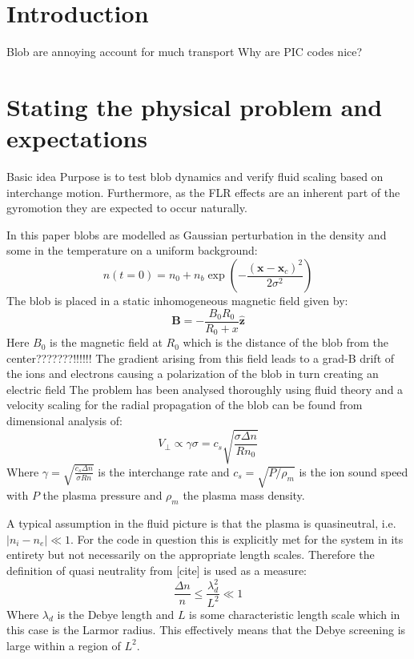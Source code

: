 \documentclass[9pt,twocolumn]{article}
\newcommand{\fd}[1]{\mathbf{#1}}
\renewcommand{\=}[1]{\stackrel{#1}{=}} %
\theoremstyle{definition}
\theoremstyle{remark}
\begin{document}
\section{Introduction}
Blob are annoying account for much transport
Why are PIC codes nice?
\section{Stating the physical problem and expectations}
Basic idea
Purpose is to test blob dynamics and verify fluid scaling based on interchange motion. Furthermore, as the FLR effects are an inherent part of the gyromotion they are expected to occur naturally.

In this paper blobs are modelled as Gaussian perturbation in the density and some in the temperature on a uniform background:
\begin{equation}
n(t=0) = n_0+ n_b\exp\left(-\frac{(\fd x-\fd x_c)^2}{2\sigma^2}\right)
\end{equation}
The blob is placed in a static inhomogeneous magnetic field given by:
\begin{equation}
\fd B = -\frac{B_0R_0}{R_0+x}{\fd {\hat{z}}}
\end{equation}
Here $B_0$ is the magnetic field at $R_0$ which is the distance of the blob from the center???????!!!!!!
The gradient arising from this field leads to a grad-B drift of the ions and electrons causing a polarization of the blob in turn creating an electric field 
The problem has been analysed thoroughly using fluid theory and a velocity scaling for the radial propagation of the blob can be found from dimensional analysis of:
\begin{equation}
V_{\perp} \propto \gamma\sigma = c_s\sqrt{\frac{\sigma\Delta n}{R n_0}}
\end{equation}
Where $\gamma=\sqrt{\frac{c_s\Delta n}{\sigma R n}}$ is the interchange rate and $c_s=\sqrt{P/\rho_m}$ is the ion sound speed with $P$ the plasma pressure and $\rho_m$ the plasma mass density.

A typical assumption in the fluid picture is that the plasma is quasineutral, i.e. $|n_i-n_e|\ll 1$. For the code in question this is explicitly met for the system in its entirety but not necessarily on the appropriate length scales. Therefore the definition of quasi neutrality from [cite] is used as a measure:
\begin{equation}
\frac{\Delta n}{n}\leqslant \frac{\lambda_d^2}{L^2}\ll 1
\end{equation}
Where $\lambda_d$ is the Debye length and $L$ is some characteristic length scale which in this case is the Larmor radius. This effectively means that the Debye screening is large within a region of $L^2$. 
\end{document}
